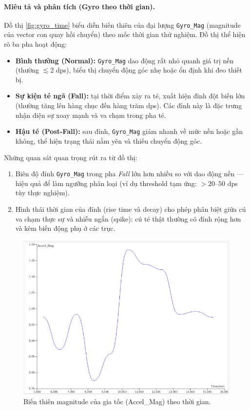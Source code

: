 \paragraph{Miêu tả và phân tích (Gyro theo thời gian).}
Đồ thị \ref{fig:gyro_time} biểu diễn biến thiên của đại lượng \texttt{Gyro\_Mag} (magnitude của vector con quay hồi chuyển) theo mốc thời gian thử nghiệm. Đồ thị thể hiện rõ ba pha hoạt động: 
\begin{itemize}
  \item \textbf{Bình thường (Normal):} \texttt{Gyro\_Mag} dao động rất nhỏ quanh giá trị nền (thường $\lesssim 2$ dps), biểu thị chuyển động góc nhẹ hoặc ổn định khi đeo thiết bị.
  \item \textbf{Sự kiện té ngã (Fall):} tại thời điểm xảy ra té, xuất hiện đỉnh đột biến lớn (thường tăng lên hàng chục đến hàng trăm dps). Các đỉnh này là đặc trưng nhận diện sự xoay mạnh và va chạm trong pha té.
  \item \textbf{Hậu té (Post-Fall):} sau đỉnh, \texttt{Gyro\_Mag} giảm nhanh về mức nền hoặc gần không, thể hiện trạng thái nằm yên và thiếu chuyển động góc.
\end{itemize}

Những quan sát quan trọng rút ra từ đồ thị:
\begin{enumerate}
  \item Biên độ đỉnh \texttt{Gyro\_Mag} trong pha \textit{Fall} lớn hơn nhiều so với dao động nền — hiệu quả để làm ngưỡng phân loại (ví dụ threshold tạm ứng: $>20$--$50$ dps tùy thực nghiệm).
  \item Hình thái thời gian của đỉnh (rise time và decay) cho phép phân biệt giữa cú va chạm thực sự và nhiễu ngắn (spike): cú té thật thường có đỉnh rộng hơn và kèm biến động phụ ở các trục.
\end{enumerate}

\vspace{6pt}

\begin{figure}[H]
    \centering
    \includegraphics[width=0.95\linewidth]{figures/accel_time.png}
    \caption{Biến thiên magnitude của gia tốc (Accel\_Mag) theo thời gian.}
    \label{fig:accel_time}
\end{figure}

